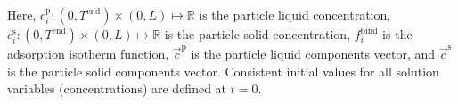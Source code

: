\documentclass{article}
\begin{document}
Here, $c^{\mathrm{p}}_{i}\colon (0, T^\mathrm{end}) \times (0, L) \mapsto \mathbb{R}$ is the particle liquid concentration, $c^{\mathrm{s}}_{i}\colon (0, T^\mathrm{end}) \times (0, L) \mapsto \mathbb{R}$ is the particle solid concentration, $f^\mathrm{bind}_{i}$ is the adsorption isotherm function, $\vec{c}^\mathrm{p}$ is the particle liquid components vector, and $\vec{c}^\mathrm{s}$ is the particle solid components vector.
Consistent initial values for all solution variables (concentrations) are defined at $t = 0$.
\end{document}

